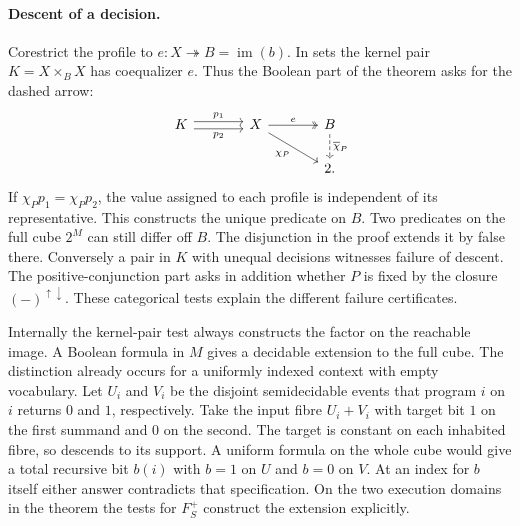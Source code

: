 \documentclass[11pt,a4paper]{article}
\theoremstyle{definition}
\theoremstyle{remark}\newaliascnt{remark}{theorem}
\numberwithin{equation}{section}
\begin{document}
\paragraph{Descent of a decision.}
Corestrict the profile to \(e:X\twoheadrightarrow B=\operatorname{im}(b)\). In sets the kernel pair \(K=X\times_B X\) has coequalizer \(e\). Thus the Boolean part of the theorem asks for the dashed arrow:
\[
\begin{tikzcd}[column sep=large]
 K\arrow[r,shift left=.6ex,"p_1"]\arrow[r,shift right=.6ex,"p_2"']&
 X\arrow[r,two heads,"e"]\arrow[dr,"\chi_P"']&
 B\arrow[d,dashed,"\overline{\chi}_P"]\\
 &&2 .
\end{tikzcd}
\]
If \(\chi_Pp_1=\chi_Pp_2\), the value assigned to each profile is independent of its representative. This constructs the unique predicate on \(B\). Two predicates on the full cube \(2^M\) can still differ off \(B\). The disjunction in the proof extends it by false there. Conversely a pair in \(K\) with unequal decisions witnesses failure of descent. The positive-conjunction part asks in addition whether \(P\) is fixed by the closure \((-)^{\uparrow\downarrow}\). These categorical tests explain the different failure certificates.

Internally the kernel-pair test always constructs the factor on the reachable image. A Boolean formula in $M$ gives a decidable extension to the full cube. The distinction already occurs for a uniformly indexed context with empty vocabulary. Let $U_i$ and $V_i$ be the disjoint semidecidable events that program $i$ on $i$ returns $0$ and $1$, respectively. Take the input fibre $U_i+V_i$ with target bit $1$ on the first summand and $0$ on the second. The target is constant on each inhabited fibre, so descends to its support. A uniform formula on the whole cube would give a total recursive bit $b(i)$ with $b=1$ on $U$ and $b=0$ on $V$. At an index for $b$ itself either answer contradicts that specification. On the two execution domains in the theorem the tests for $F_S^+$ construct the extension explicitly.
\end{document}
